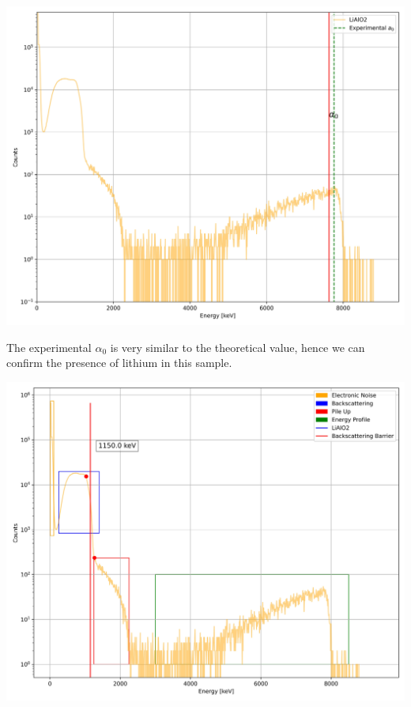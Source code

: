\documentclass{article}
\begin{document}
\begin{multicols}{2}
\begin{center}
    \label{TT_21}
    \centering
    \includegraphics[scale = 0.3]{../../images/OverlapLiAlO2.jpeg}
\end{center}

The experimental $\alpha_0$ is very similar to the theoretical value, hence we can confirm the presence of lithium in this sample.

\begin{center}
    \label{TT_21}
    \centering
    \includegraphics[scale = 0.3]{../../images/FullAnalysisLiAlO2.jpeg}
\end{center}


\end{multicols}
\end{document}
